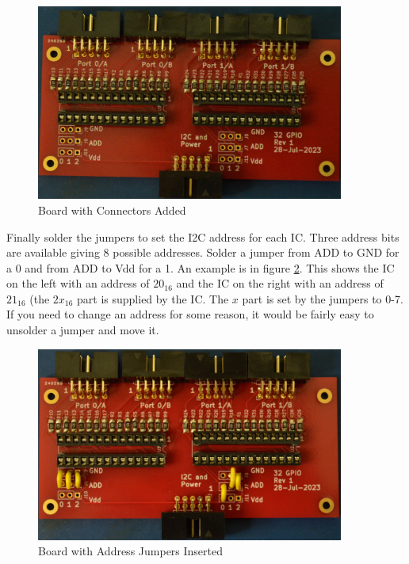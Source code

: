 \documentclass[10pt, openany]{book}
\begin{document}
\begin{figure}[ht!]
  \centering
  \includegraphics[width=0.9\textwidth]{../Pictures/Connectors.jpg}
  \caption{Board with Connectors Added}
  \label{fig:Connectors}
\end{figure}

Finally solder the jumpers to set the I2C address for each IC.  Three address bits are available giving 8 possible addresses.  Solder a jumper from ADD to GND for a 0 and from ADD to Vdd for a 1.  An example is in figure \ref{fig:Jumpers}.  This shows the IC on the left with an address of $20_{16}$ and the IC on the right with an address of $21_{16}$ (the $2x_{16}$ part is supplied by the IC.  The $x$ part is set by the jumpers to 0-7. If you need to change an address for some reason, it would be fairly easy to unsolder a jumper and move it.

\begin{figure}[ht!]
  \centering
  \includegraphics[width=0.9\textwidth]{../Pictures/Jumpers.jpg}
  \caption{Board with Address Jumpers Inserted}
  \label{fig:Jumpers}
\end{figure}
\end{document}
